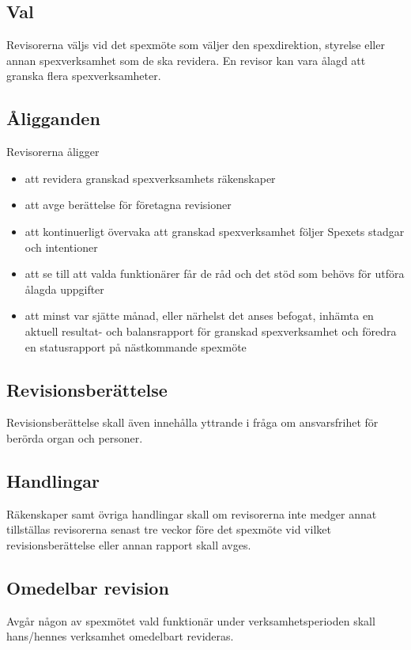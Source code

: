 \documentclass[a4paper]{article}
\begin{document}
\subsection{Val}
Revisorerna väljs vid det spexmöte som väljer den spexdirektion, styrelse eller annan spexverksamhet som de ska revidera. En revisor kan vara ålagd att granska flera spexverksamheter.

\subsection{Åligganden}
Revisorerna åligger

\begin{itemize}
  \item att revidera granskad spexverksamhets räkenskaper
  \item att avge berättelse för företagna revisioner
  \item att kontinuerligt övervaka att granskad spexverksamhet följer Spexets stadgar och intentioner
  \item att se till att valda funktionärer får de råd och det stöd som behövs för utföra ålagda uppgifter
  \item att minst var sjätte månad, eller närhelst det anses befogat, inhämta en aktuell resultat- och balansrapport för granskad spexverksamhet och föredra en statusrapport på nästkommande spexmöte
\end{itemize}

\subsection{Revisionsberättelse}
Revisionsberättelse skall även innehålla yttrande i fråga om ansvarsfrihet för berörda organ och personer.

\subsection{Handlingar}
Räkenskaper samt övriga handlingar skall om revisorerna inte medger annat tillställas revisorerna senast tre veckor före det spexmöte vid vilket revisionsberättelse eller annan rapport skall avges.

\subsection{Omedelbar revision}
Avgår någon av spexmötet vald funktionär under verksamhetsperioden skall hans/hennes verksamhet omedelbart revideras.
\end{document}
